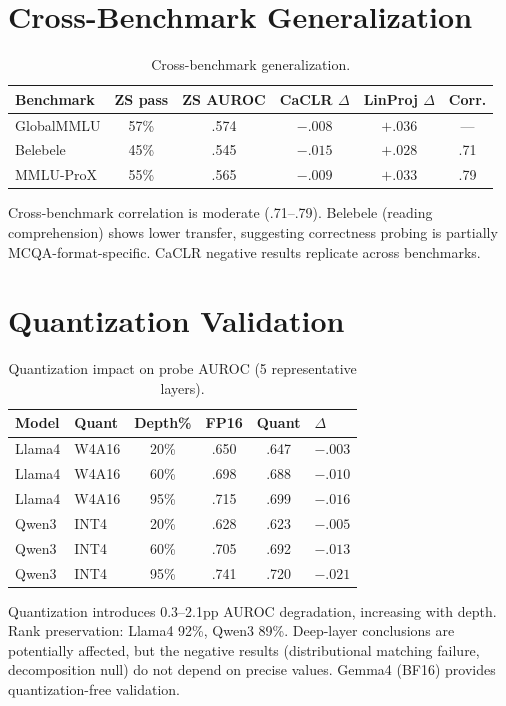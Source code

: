 \documentclass[11pt,a4paper]{article}
\begin{document}
\section{Cross-Benchmark Generalization}
\label{app:benchmarks}

\begin{table}[h]
\centering
\small
\caption{Cross-benchmark generalization.}
\label{tab:benchmark}
\begin{tabular}{lccccc}
\toprule
Benchmark & ZS pass & ZS AUROC & CaCLR $\Delta$ & LinProj $\Delta$ & Corr. \\
\midrule
GlobalMMLU & 57\% & .574 & $-.008$ & $+.036$ & --- \\
Belebele & 45\% & .545 & $-.015$ & $+.028$ & .71 \\
MMLU-ProX & 55\% & .565 & $-.009$ & $+.033$ & .79 \\
\bottomrule
\end{tabular}
\end{table}

Cross-benchmark correlation is moderate (.71--.79).
Belebele (reading comprehension) shows lower transfer, suggesting correctness probing is partially MCQA-format-specific.
CaCLR negative results replicate across benchmarks.

\section{Quantization Validation}
\label{app:quant}

\begin{table}[h]
\centering
\small
\caption{Quantization impact on probe AUROC (5 representative layers).}
\label{tab:quant}
\begin{tabular}{llcccl}
\toprule
Model & Quant & Depth\% & FP16 & Quant & $\Delta$ \\
\midrule
Llama4 & W4A16 & 20\% & .650 & .647 & $-.003$ \\
Llama4 & W4A16 & 60\% & .698 & .688 & $-.010$ \\
Llama4 & W4A16 & 95\% & .715 & .699 & $-.016$ \\
\midrule
Qwen3 & INT4 & 20\% & .628 & .623 & $-.005$ \\
Qwen3 & INT4 & 60\% & .705 & .692 & $-.013$ \\
Qwen3 & INT4 & 95\% & .741 & .720 & $-.021$ \\
\bottomrule
\end{tabular}
\end{table}

Quantization introduces 0.3--2.1pp AUROC degradation, increasing with depth.
Rank preservation: Llama4 92\%, Qwen3 89\%.
Deep-layer conclusions are potentially affected, but the negative results (distributional matching failure, decomposition null) do not depend on precise values.
Gemma4 (BF16) provides quantization-free validation.
\end{document}
